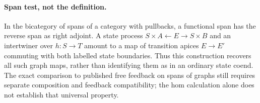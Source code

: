\documentclass[11pt]{article}
\begin{document}
\paragraph{Span test, not the definition.} In the bicategory of spans of a category with pullbacks, a functional span has the reverse span as right adjoint. A state process $S\times A\leftarrow E\to S\times B$ and an intertwiner over $h:S\to T$ amount to a map of transition apices $E\to E'$ commuting with both labelled state boundaries. Thus this construction recovers all such graph maps, rather than identifying them as in an ordinary state coend. The exact comparison to published free feedback on spans of graphs still requires separate composition and feedback compatibility; the hom calculation alone does not establish that universal property.
\end{document}
